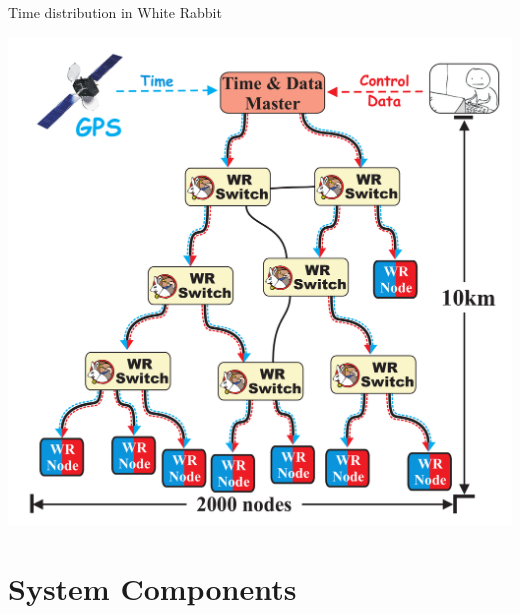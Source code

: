 \documentclass[compress,red]{beamer}
\begin{document}
\subsection{}
\begin{frame}{Time distribution in White Rabbit}



    \begin{center}
    \includegraphics[height=0.8\textheight]{network/wr_network-new.pdf}
    \end{center}

\end{frame}

\section{System Components}
\end{document}
